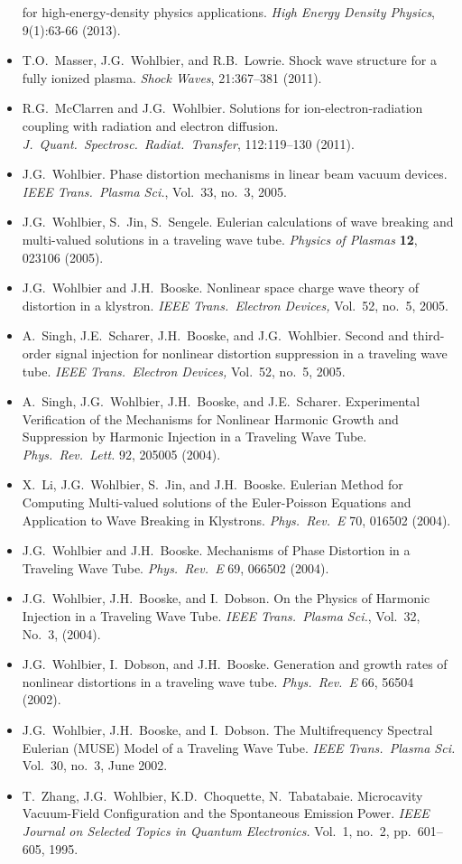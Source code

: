 \documentclass[12pt]{article}
\begin{document}
\begin{itemize}
  for high-energy-density physics applications. {\it High Energy
    Density Physics}, 9(1):63-66 (2013).
\item T.O.~Masser, J.G.~Wohlbier, and R.B.~Lowrie. Shock wave structure
  for a fully ionized plasma. {\it Shock Waves}, 21:367--381 (2011).
\item R.G.~McClarren and J.G.~Wohlbier. Solutions for
  ion-electron-radiation coupling with radiation and electron
  diffusion. {\it J.~Quant.~Spectrosc.~Radiat.~Transfer}, 112:119--130
  (2011).
\item J.G.~Wohlbier. Phase distortion mechanisms in linear beam
  vacuum devices. {\it IEEE Trans.~Plasma Sci.}, Vol.~33, no.~3,
  2005.
\item J.G.~Wohlbier, S.~Jin, S.~Sengele. Eulerian calculations of
  wave breaking and multi-valued solutions in a traveling wave
  tube. {\it Physics of Plasmas} {\bf 12}, 023106 (2005).
\item J.G.~Wohlbier and J.H.~Booske. Nonlinear space charge wave theory
  of distortion in a klystron. {\it IEEE Trans.~Electron Devices,}
  Vol.~52, no.~5, 2005.
\item A.~Singh, J.E.~Scharer, J.H.~Booske, and J.G.~Wohlbier.
  Second and third-order signal injection for nonlinear
  distortion suppression in a traveling wave tube. {\it IEEE
    Trans.~Electron Devices,} Vol.~52, no.~5, 2005.
\item A.~Singh, J.G.~Wohlbier, J.H.~Booske, and
  J.E.~Scharer. Experimental Verification of the Mechanisms for
  Nonlinear Harmonic Growth and Suppression by Harmonic Injection in a
  Traveling Wave Tube. {\it Phys.~Rev.~Lett.} 92, 205005 (2004).
\item X.~Li, J.G.~Wohlbier, S.~Jin, and J.H.~Booske.
  Eulerian Method for Computing Multi-valued solutions of the Euler-Poisson
  Equations and Application to Wave Breaking in Klystrons.
  {\it Phys.~Rev.~E} 70, 016502 (2004).
\item J.G.~Wohlbier and J.H.~Booske.
  Mechanisms of Phase Distortion in a Traveling Wave Tube.
  {\it Phys.~Rev.~E} 69, 066502 (2004).
\item J.G.~Wohlbier, J.H.~Booske, and I.~Dobson.
  On the Physics of Harmonic Injection in a Traveling Wave Tube.
  {\it IEEE Trans.~Plasma Sci.}, Vol.~32, No.~3, (2004).
\item J.G.~Wohlbier, I.~Dobson, and J.H.~Booske.
  Generation and growth rates of nonlinear distortions in a traveling
  wave tube. {\it Phys.~Rev.~E} 66, 56504 (2002).
\item J.G.~Wohlbier, J.H.~Booske, and I.~Dobson.
  The Multifrequency Spectral Eulerian (MUSE) Model of a Traveling Wave
  Tube. {\it IEEE Trans.~Plasma Sci.} Vol.~30, no.~3, June 2002.
\item T.~Zhang, J.G.~Wohlbier, K.D.~Choquette, N.~Tabatabaie.
  Microcavity Vacuum-Field Configuration and the Spontaneous Emission
  Power. {\it IEEE Journal on Selected Topics in Quantum Electronics.}
  Vol.~1, no.~2, pp.~601--605, 1995.
\end{itemize}
\end{document}
